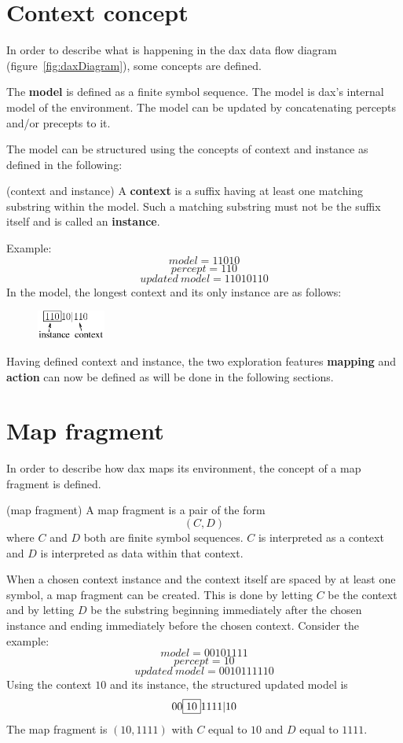 \section{Context concept}
In order to describe what is happening in the dax data flow diagram
(figure~\ref{fig:daxDiagram}), some concepts are defined.

The {\bf model} is defined as a finite symbol sequence. The
model is dax's internal model of the environment. The model
can be updated by concatenating percepts and/or precepts to it.

The model can be structured using the concepts of context and
instance as defined in the following:
\begin{definition}
(context and instance) \hfill\break
A {\bf context} is a suffix having
at least one matching substring within the model.
Such a matching substring must not be the suffix itself and is
called an {\bf instance}.
\label{def1}
\end{definition}
Example:\hfill\break
$$
model = 11010
$$
$$
percept = 110
$$
$$
updated\ model = 11010110
$$
In the model, the longest context and its only instance are as follows:
\hfill\break
\begin{figure}[ht]
  \begin{center}
  \includegraphics[width=0.2\textwidth, keepaspectratio]
                                        {Eps/contextConcept.eps}
  \end{center}
  \label{fig:contextConcept}
\end{figure}
\hfill\break
Having defined context and instance, the two exploration features
{\bf mapping} and {\bf action} can now be defined as will be done in the
following sections.

\section{Map fragment}
In order to describe how dax maps its environment, the concept of a map
fragment is defined.
\begin{definition}
(map fragment) \hfill\break
A map fragment is a pair of the form
$$
(C, D)
$$
where $C$ and $D$ both are finite symbol sequences. $C$ is interpreted as a
context and $D$ is interpreted as data within that context.
\end{definition}
When a chosen context instance and the context itself are spaced by at least
one symbol, a map fragment can be created.
This is done by letting $C$ be the context and
by letting $D$ be the substring beginning immediately after the chosen instance
and ending immediately before the chosen context.
Consider the example:
$$
model = 00101111
$$
$$
percept = 10
$$
$$
updated\ model = 0010111110
$$
\hfill\break
Using the context $10$ and its instance, the structured updated model is
$$
00\framebox{$10$}1111 | 10
$$
\hfill\break
The map fragment is $(10, 1111)$ with $C$ equal to $10$ and $D$ equal to $1111$.

